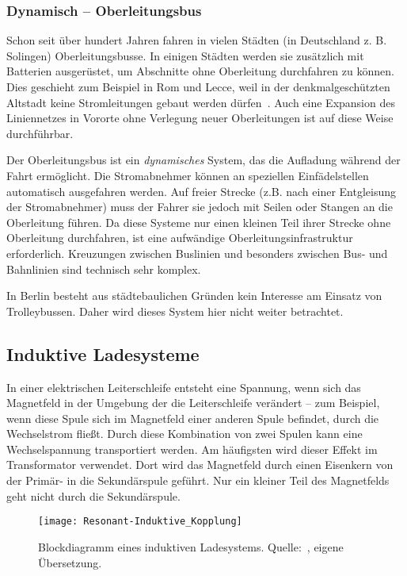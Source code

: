 \subsubsection{Dynamisch – Oberleitungsbus}
Schon seit über hundert Jahren fahren in vielen Städten (in Deutschland z. B. Solingen) Oberleitungsbusse. In einigen Städten werden sie zusätzlich mit Batterien ausgerüstet, um Abschnitte ohne Oberleitung durchfahren zu können. Dies geschieht zum Beispiel in Rom und Lecce, weil in der denkmalgeschützten Altstadt keine Stromleitungen gebaut werden dürfen~\cite[S. 66]{tub_aleph001746639}. Auch eine Expansion des Liniennetzes in Vororte ohne Verlegung neuer Oberleitungen ist auf diese Weise durchführbar.

Der Oberleitungsbus ist ein \emph{dynamisches} System, das die Aufladung während der Fahrt ermöglicht. Die Stromabnehmer können an speziellen Einfädelstellen automatisch ausgefahren werden. Auf freier Strecke (z.B. nach einer Entgleisung der Stromabnehmer) muss der Fahrer sie jedoch mit Seilen oder Stangen an die Oberleitung führen. Da diese Systeme nur einen kleinen Teil ihrer Strecke ohne Oberleitung durchfahren, ist eine aufwändige Oberleitungsinfrastruktur erforderlich. Kreuzungen zwischen Buslinien und besonders zwischen Bus- und Bahnlinien sind technisch sehr komplex.

In Berlin besteht aus städtebaulichen Gründen kein Interesse am Einsatz von Trolleybussen. Daher wird dieses System hier nicht weiter betrachtet.
                                 
\subsection{Induktive Ladesysteme}
In einer elektrischen Leiterschleife entsteht eine Spannung, wenn sich das Magnetfeld in der Umgebung der die Leiterschleife verändert – zum Beispiel, wenn diese Spule sich im Magnetfeld einer anderen Spule befindet, durch die Wechselstrom fließt. Durch diese Kombination von zwei Spulen kann eine Wechselspannung transportiert werden. Am häufigsten wird dieser Effekt im Transformator verwendet. Dort wird das Magnetfeld durch einen Eisenkern von der Primär- in die Sekundärspule geführt. Nur ein kleiner Teil des Magnetfelds geht nicht durch die Sekundärspule.

\begin{figure}\centering
	\texttt{[image: Resonant-Induktive\_Kopplung]}
	\caption[Blockdiagramm eines induktiven Ladesystems]{Blockdiagramm eines induktiven Ladesystems. Quelle:~\cite{lukic2013cutting}, eigene Übersetzung.}
	\label{abb_ResIndKopplung}
\end{figure}

